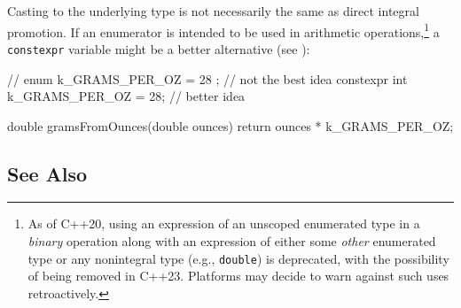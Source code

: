 %
%
%
%

Casting to the underlying type is not necessarily the same as direct integral promotion. If
an enumerator is intended to be used in arithmetic operations,\footnote{As of C++20, using an expression of an unscoped enumerated type in a \emph{binary} operation along with 
an expression of either some \emph{other} enumerated type or any nonintegral type (e.g., 
\lstinline!double!) is deprecated, with the possibility of being removed in C++23. Platforms 
may decide to warn against such uses retroactively.} a \lstinline!constexpr! variable might 
be a better alternative (see ):

\begin{emcppslisting}
// enum { k_GRAMS_PER_OZ = 28 };    // not the best idea
constexpr int k_GRAMS_PER_OZ = 28;  // better idea

double gramsFromOunces(double ounces)
{
    return ounces * k_GRAMS_PER_OZ;
}
\end{emcppslisting}


\subsection[See Also]{See Also}\label{see-also}

